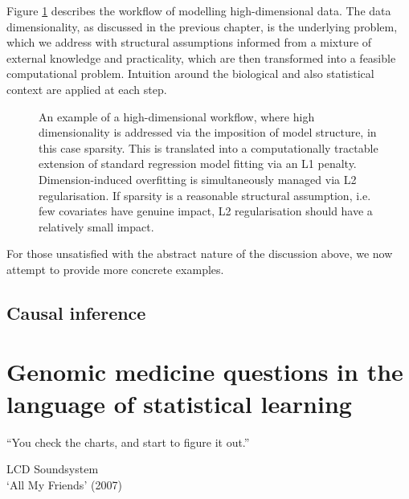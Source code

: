 \documentclass[thesis.tex]{subfiles}
\begin{document}
Figure \ref{fig:workflow} describes the workflow of modelling high-dimensional data. The data dimensionality, as discussed in the previous chapter, is the underlying problem, which we address with structural assumptions informed from a mixture of external knowledge and practicality, which are then transformed into a feasible computational problem. Intuition around the biological and also statistical context are applied at each step.

\begin{figure}[htbp]
\centering
{}
\caption{An example of a high-dimensional workflow, where high dimensionality is addressed via the imposition of model structure, in this case sparsity. This is translated into a computationally tractable extension of standard regression model fitting via an L1 penalty. Dimension-induced overfitting is simultaneously managed via L2 regularisation. If sparsity is a reasonable structural assumption, i.e. few covariates have genuine impact, L2 regularisation should have a relatively small impact.\label{fig:workflow}}
\end{figure}

For those unsatisfied with the abstract nature of the discussion above, we now attempt to provide more concrete examples.

\subsection{Causal inference}

\section{Genomic medicine questions in the language of statistical learning} \label{sec:questions}
\epigraph{``You check the charts, and start to figure it out.''}{LCD Soundsystem \\`All My Friends' (2007)}
\end{document}
